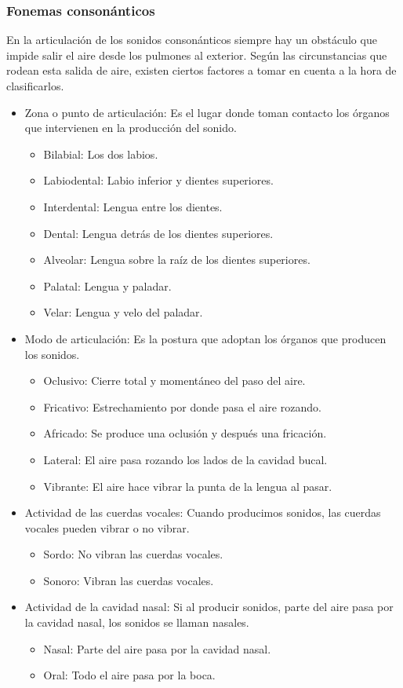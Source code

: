 \subsubsection{Fonemas consonánticos}

En la articulación de los sonidos consonánticos siempre hay un obstáculo que impide salir el aire desde los pulmones al exterior. Según las circunstancias que rodean esta salida de aire, existen ciertos factores a tomar en cuenta a la hora de clasificarlos.

\begin{itemize}
\item	Zona o punto de articulación: Es el lugar donde toman contacto los órganos que intervienen en la producción del sonido.
\begin{itemize}
\item	Bilabial: Los dos labios.
\item	Labiodental: Labio inferior y dientes superiores.
\item	Interdental: Lengua entre los dientes.
\item	Dental: Lengua detrás de los dientes superiores.
\item	Alveolar: Lengua sobre la raíz de los dientes superiores.
\item	Palatal: Lengua y paladar.
\item	Velar: Lengua y velo del paladar.
\end{itemize}
\item	Modo de articulación: Es la postura que adoptan los órganos que producen los sonidos.
\begin{itemize}
\item	Oclusivo: Cierre total y momentáneo del paso del aire.
\item	Fricativo: Estrechamiento por donde pasa el aire rozando.
\item	Africado: Se produce una oclusión y después una fricación.
\item	Lateral: El aire pasa rozando los lados de la cavidad bucal.
\item	Vibrante: El aire hace vibrar la punta de la lengua al pasar.
\end{itemize}
\item	Actividad de las cuerdas vocales: Cuando producimos sonidos, las cuerdas vocales pueden vibrar o no vibrar.
\begin{itemize}
\item	Sordo: No vibran las cuerdas vocales.
\item	Sonoro: Vibran las cuerdas vocales.
\end{itemize}
\item	Actividad de la cavidad nasal: Si al producir sonidos, parte del aire pasa por la cavidad nasal, los sonidos se llaman nasales.
\begin{itemize}
\item	Nasal: Parte del aire pasa por la cavidad nasal.
\item	Oral: Todo el aire pasa por la boca.
\end{itemize}
\end{itemize}

